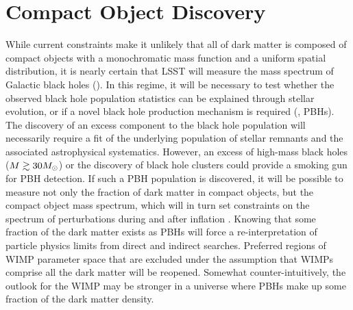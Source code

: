 \section{Compact Object Discovery}
\label{sec:pbh_discovery}

While current constraints make it unlikely that all of dark matter is composed of compact objects with a monochromatic mass function and a uniform spatial distribution, it is nearly certain that LSST will measure the mass spectrum of Galactic black holes ().
In this regime, it will be necessary to test whether the observed black hole population statistics can be explained through stellar evolution, or if a novel black hole production mechanism is required (\ie, PBHs).
The discovery of an excess component to the black hole population will necessarily require a fit of the underlying population of stellar remnants and the associated astrophysical systematics. 
However, an excess of high-mass black holes ($M \gtrsim 30M_\odot$) or the discovery of black hole clusters \citep[\eg,][]{1603.05234} could provide a smoking gun for PBH detection.
If such a PBH population is discovered, it will be possible to measure not only the fraction of dark matter in compact objects, but the compact object mass spectrum, which will in turn set constraints on the spectrum of perturbations during and after inflation \citep[\eg,][]{1702.03901}.
Knowing that some fraction of the dark matter exists as PBHs will force a re-interpretation of particle physics limits from direct and indirect searches.
Preferred regions of WIMP parameter space that are excluded under the assumption that WIMPs comprise all the dark matter will be reopened.
Somewhat counter-intuitively, the outlook for the WIMP may be stronger in a universe where PBHs make up some fraction of the dark matter density.

